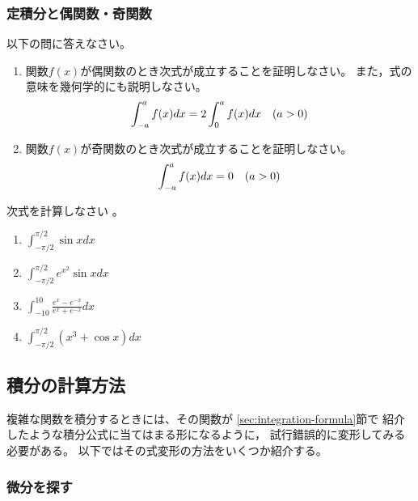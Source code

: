 \documentclass[twocolumn,11pt]{jarticle}
\begin{document}
\subsubsection{定積分と偶関数・奇関数}
\question 以下の問に答えなさい。
\begin{enumerate}
\item 関数$f(x)$が偶関数のとき次式が成立することを証明しなさい。
  また，式の意味を幾何学的にも説明しなさい。
  \begin{align}
    \int_{-a}^{a}f(x)dx=2\int_{0}^{a}f(x)dx\quad(a>0)\notag
  \end{align}
\item 関数$f(x)$が奇関数のとき次式が成立することを証明しなさい。
  \begin{align}
    \int_{-a}^{a}f(x)dx=0\quad(a>0)\notag
  \end{align}
\end{enumerate}
\nexercise
次式を計算しなさい
。
\begin{enumerate}
\item\label{iitem:int_(-pi/2)^(pi/2)sinxdx}
  $\displaystyle\int_{-\pi/2}^{\pi/2}\sin x dx$
\item\label{iitem:int_(-pi)^(pi)e^(xx)sinxdx}
  $\displaystyle\int_{-\pi/2}^{\pi/2}e^{x^2}\sin x dx$
\item\label{iitem:int_(-10)^(10)tanhxdx}
  $\displaystyle\int_{-10}^{10}\frac{e^x-e^{-x}}{e^x+e^{-x}}dx$
\item\label{iitem:int_(-pi/2)^(pi/2)(x^3+cosx)dx}
  $\displaystyle\int_{-\pi/2}^{\pi/2}(x^3+\cos x)dx$
\end{enumerate}


\subsection{積分の計算方法}

複雑な関数を積分するときには、その関数が
\ref{sec:integration-formula}節で
紹介したような積分公式に当てはまる形になるように，
試行錯誤的に変形してみる必要がある。
以下ではその式変形の方法をいくつか紹介する。

\subsubsection{微分を探す}
\end{document}
